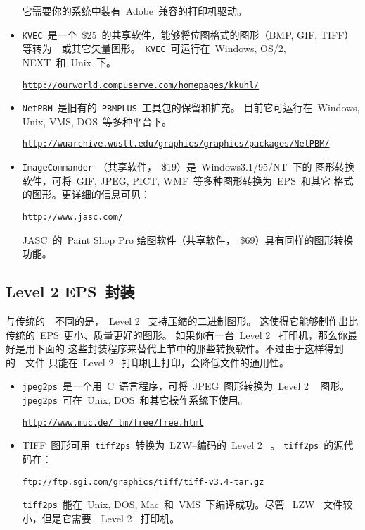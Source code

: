 \begin{itemize}
	它需要你的系统中装有~Adobe~兼容的打印机驱动。
	
	\item \texttt{KVEC}~是一个~\$25~的共享软件，能够将位图格式的图形（BMP, GIF,
	TIFF）等转为~\PS~或其它矢量图形。~\texttt{KVEC}~可运行在~Windows, OS/2,
	NEXT~和~Unix~下。
	
	\href{http://ourworld.compuserve.com/homepages/kkuhl/}%
	{\texttt{http://ourworld.compuserve.com/homepages/kkuhl/}}
	
	\item \texttt{NetPBM}~是旧有的~\texttt{PBMPLUS}~工具包的保留和扩充。
	目前它可运行在~Windows, Unix, VMS, DOS~等多种平台下。
	
	\href{http://wuarchive.wustl.edu/graphics/graphics/packages/NetPBM/}%
	{\texttt{http://wuarchive.wustl.edu/graphics/graphics/packages/NetPBM/}}
	
	\item \texttt{ImageCommander}~（共享软件，~\$19）是~Windows3.1/95/NT~下的
	图形转换软件，可将~GIF, JPEG, PICT, WMF~等多种图形转换为~EPS~和其它
	格式的图形。更详细的信息可见：
	
	\href{http://www.jasc.com/}{\texttt{http://www.jasc.com/}}
	
	JASC~的~Paint Shop Pro 绘图软件（共享软件，~\$69）具有同样的图形转换
	功能。
\end{itemize}

\subsection[Level 2 EPS~封装]{Level 2 EPS~封装}\label{ssec:epswrapper}

与传统的~\PS~不同的是，~Level 2 \PS~支持压缩的二进制图形。
这使得它能够制作出比传统的~EPS~更小、质量更好的图形。
如果你有一台~Level 2 \PS~打印机，那么你最好是用下面的
这些封装程序来替代上节中的那些转换软件。不过由于这样得到的~\PS~文件
只能在~Level 2 \PS~打印机上打印，会降低文件的通用性。

\begin{itemize}
	\item \texttt{jpeg2ps}~是一个用~C~语言程序，可将~JPEG~图形转换为~Level 2 \PS~
	图形。\texttt{jpeg2ps}~可在~Unix, DOS~和其它操作系统下使用。
	
	\href{http://www.muc.de/~tm/free/free.html}{\texttt{http://www.muc.de/~tm/free/free.html}}
	
	\item TIFF~图形可用~\texttt{tiff2ps}~转换为~LZW--编码的~Level 2 \PS~。
	\texttt{tiff2ps}~的源代码在：
	
	\href{ftp://ftp.sgi.com/graphics/tiff/tiff-v3.4-tar.gz}%
	{\texttt{ftp://ftp.sgi.com/graphics/tiff/tiff-v3.4-tar.gz}}
	
	\texttt{tiff2ps}~能在~Unix, DOS, Mac~和~VMS~下编译成功。尽管
	~LZW \PS~文件较小，但是它需要~~Level 2 \PS~打印机。
\end{itemize}

